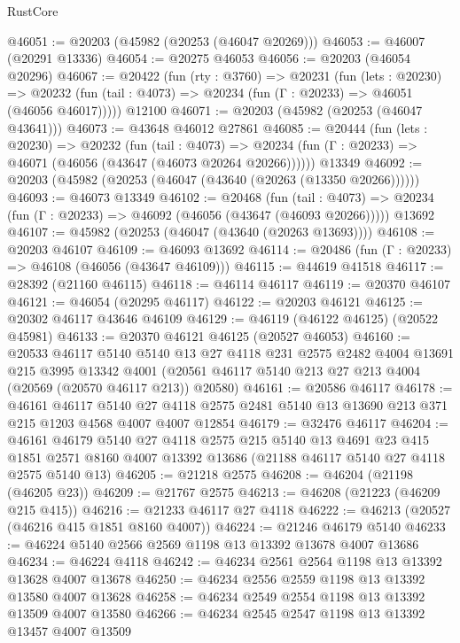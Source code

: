 \begin{lexlean}{RustCore}
\begin{coremodule}
@46051 := @20203 (@45982 (@20253 (@46047 @20269)))
@46053 := @46007 (@20291 @13336)
@46054 := @20275 @46053
@46056 := @20203 (@46054 @20296)
@46067 := @20422
    (fun (rty : @3760) =>
    @20231
      (fun (lets : @20230) =>
      @20232 (fun (tail : @4073) => @20234 (fun (Γ : @20233) => @46051 (@46056 @46017)))))
    @12100
@46071 := @20203 (@45982 (@20253 (@46047 @43641)))
@46073 := @43648 @46012 @27861
@46085 := @20444
    (fun (lets : @20230) =>
    @20232
      (fun (tail : @4073) =>
      @20234 (fun (Γ : @20233) => @46071 (@46056 (@43647 (@46073 @20264 @20266))))))
    @13349
@46092 := @20203 (@45982 (@20253 (@46047 (@43640 (@20263 (@13350 @20266))))))
@46093 := @46073 @13349
@46102 := @20468
    (fun (tail : @4073) => @20234 (fun (Γ : @20233) => @46092 (@46056 (@43647 (@46093 @20266)))))
    @13692
@46107 := @45982 (@20253 (@46047 (@43640 (@20263 @13693))))
@46108 := @20203 @46107
@46109 := @46093 @13692
@46114 := @20486 (fun (Γ : @20233) => @46108 (@46056 (@43647 @46109)))
@46115 := @44619 @41518
@46117 := @28392 (@21160 @46115)
@46118 := @46114 @46117
@46119 := @20370 @46107
@46121 := @46054 (@20295 @46117)
@46122 := @20203 @46121
@46125 := @20302 @46117 @43646 @46109
@46129 := @46119 (@46122 @46125) (@20522 @45981)
@46133 := @20370 @46121 @46125 (@20527 @46053)
@46160 := @20533
    @46117
    @5140
    @5140
    @13
    @27
    @4118
    @231
    @2575
    @2482
    @4004
    @13691
    @215
    @3995
    @13342
    @4001
    (@20561 @46117 @5140 @213 @27 @213 @4004 (@20569 (@20570 @46117 @213)) @20580)
@46161 := @20586 @46117
@46178 := @46161
    @46117
    @5140
    @27
    @4118
    @2575
    @2481
    @5140
    @13
    @13690
    @213
    @371
    @215
    @1203
    @4568
    @4007
    @4007
    @12854
@46179 := @32476 @46117
@46204 := @46161
    @46179
    @5140
    @27
    @4118
    @2575
    @215
    @5140
    @13
    @4691
    @23
    @415
    @1851
    @2571
    @8160
    @4007
    @13392
    @13686
    (@21188 @46117 @5140 @27 @4118 @2575 @5140 @13)
@46205 := @21218 @2575
@46208 := @46204 (@21198 (@46205 @23))
@46209 := @21767 @2575
@46213 := @46208 (@21223 (@46209 @215 @415))
@46216 := @21233 @46117 @27 @4118
@46222 := @46213 (@20527 (@46216 @415 @1851 @8160 @4007))
@46224 := @21246 @46179 @5140
@46233 := @46224 @5140 @2566 @2569 @1198 @13 @13392 @13678 @4007 @13686
@46234 := @46224 @4118
@46242 := @46234 @2561 @2564 @1198 @13 @13392 @13628 @4007 @13678
@46250 := @46234 @2556 @2559 @1198 @13 @13392 @13580 @4007 @13628
@46258 := @46234 @2549 @2554 @1198 @13 @13392 @13509 @4007 @13580
@46266 := @46234 @2545 @2547 @1198 @13 @13392 @13457 @4007 @13509

\end{coremodule}
\end{lexlean}
